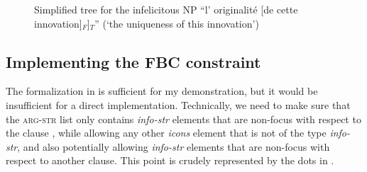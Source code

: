 {\judgewidth{\#}%
\z}

\begin{figure}
\caption{Simplified tree for the infelicitous NP ``l' originalité [de cette innovation]$_F$]$_T$'' (`the uniqueness of this innovation')}
    \label{fig:FBC-topic-subject}
\end{figure} 

\subsection{Implementing the FBC constraint}

The formalization in  is sufficient for my demonstration, but it would be insufficient for a direct implementation. Technically, we need to make sure that the \textsc{arg-str} list only contains \textit{info-str} elements that are non-focus with respect to the clause , while allowing any other \textit{icons} element that is not of the type \textit{info-str}, and also potentially allowing \textit{info-str} elements that are non-focus with respect to another clause. This point is crudely represented by the dots in .

